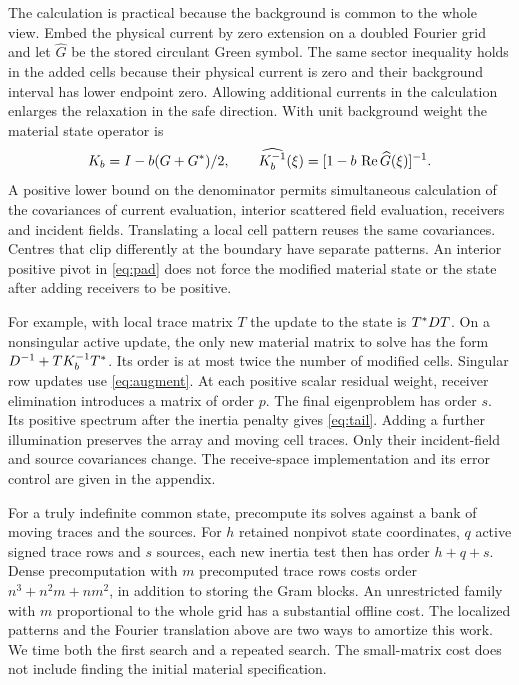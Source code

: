 The calculation is practical because the background is common to the whole view. Embed the physical current by zero extension on a doubled Fourier grid and let $\widehat G$ be the stored circulant Green symbol. The same sector inequality holds in the added cells because their physical current is zero and their background interval has lower endpoint zero. Allowing additional currents in the calculation enlarges the relaxation in the safe direction. With unit background weight the material state operator is
\begin{equation}
 K_b=I-b(G+G^{\ast})/2,\qquad
 \widehat {K_b^{-1}}(\xi)=[1-b\,\operatorname{Re}\widehat G(\xi)]^{-1}.
                                                               \label{eq:pad}
\end{equation}
A positive lower bound on the denominator permits simultaneous calculation of the covariances of current evaluation, interior scattered field evaluation, receivers and incident fields. Translating a local cell pattern reuses the same covariances. Centres that clip differently at the boundary have separate patterns. An interior positive pivot in \eqref{eq:pad} does not force the modified material state or the state after adding receivers to be positive.

For example, with local trace matrix $T$ the update to the state is $T^{\ast} D T$. On a nonsingular active update, the only new material matrix to solve has the form $D^{-1}+TK_b^{-1}T^{\ast}$. Its order is at most twice the number of modified cells. Singular row updates use \eqref{eq:augment}. At each positive scalar residual weight, receiver elimination introduces a matrix of order $p$. The final eigenproblem has order $s$. Its positive spectrum after the inertia penalty gives \eqref{eq:tail}. Adding a further illumination preserves the array and moving cell traces. Only their incident-field and source covariances change. The receive-space implementation and its error control are given in the appendix.

For a truly indefinite common state, precompute its solves against a bank of moving traces and the sources. For $h$ retained nonpivot state coordinates, $q$ active signed trace rows and $s$ sources, each new inertia test then has order $h+q+s$. Dense precomputation with $m$ precomputed trace rows costs order $n^3+n^2m+nm^2$, in addition to storing the Gram blocks. An unrestricted family with $m$ proportional to the whole grid has a substantial offline cost. The localized patterns and the Fourier translation above are two ways to amortize this work. We time both the first search and a repeated search. The small-matrix cost does not include finding the initial material specification.

